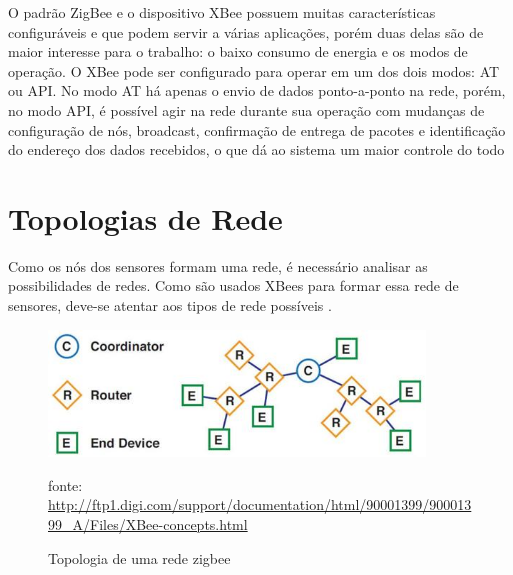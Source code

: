  O padrão ZigBee e o dispositivo XBee possuem muitas características configuráveis e que podem servir a várias aplicações\cite{xbee_book}, porém duas delas são de maior interesse para o trabalho: o baixo consumo de energia e os modos de operação. O XBee pode ser configurado para operar em um dos dois modos: AT ou API. No modo AT há apenas o envio de dados ponto-a-ponto na rede, porém, no modo API, é possível agir na rede durante sua operação com mudanças de configuração de nós, broadcast, confirmação de entrega de pacotes e identificação do endereço dos dados recebidos, o que dá ao sistema um maior controle do todo \cite{xbee_documentation}
 
\section{Topologias de Rede}
\label{Sec:Redes_topologias}
 Como os nós dos sensores formam uma rede, é necessário analisar as possibilidades de redes.  Como são usados XBees para formar essa rede de sensores, deve-se atentar aos tipos de rede possíveis \cite{xbee_book} \cite{xbee_documentation}.
 
\begin{figure}[H]
\centering
\includegraphics[width=10cm,keepaspectratio]{figuras/zigbee_network_topology.jpg}
\caption{\label{fig:zigbee_network} Topologia de uma rede zigbee}
fonte: \url{http://ftp1.digi.com/support/documentation/html/90001399/90001399_A/Files/XBee-concepts.html}
\end{figure}
 
